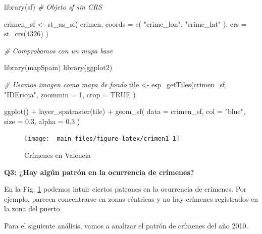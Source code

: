 \documentclass[
]{book}
\newenvironment{Shaded}{\begin{snugshade}}{\end{snugshade}}
\newcommand{\AttributeTok}[1]{\textcolor[rgb]{0.77,0.63,0.00}{#1}}
\newcommand{\CommentTok}[1]{\textcolor[rgb]{0.56,0.35,0.01}{\textit{#1}}}
\newcommand{\ConstantTok}[1]{\textcolor[rgb]{0.00,0.00,0.00}{#1}}
\newcommand{\DecValTok}[1]{\textcolor[rgb]{0.00,0.00,0.81}{#1}}
\newcommand{\FloatTok}[1]{\textcolor[rgb]{0.00,0.00,0.81}{#1}}
\newcommand{\FunctionTok}[1]{\textcolor[rgb]{0.00,0.00,0.00}{#1}}
\newcommand{\NormalTok}[1]{#1}
\newcommand{\OtherTok}[1]{\textcolor[rgb]{0.56,0.35,0.01}{#1}}
\newcommand{\SpecialCharTok}[1]{\textcolor[rgb]{0.00,0.00,0.00}{#1}}
\newcommand{\StringTok}[1]{\textcolor[rgb]{0.31,0.60,0.02}{#1}}
\begin{document}
\begin{Shaded}
\begin{Highlighting}[]

\FunctionTok{library}\NormalTok{(sf)}
\CommentTok{\# Objeto sf sin CRS}

\NormalTok{crimen\_sf }\OtherTok{\textless{}{-}} \FunctionTok{st\_as\_sf}\NormalTok{(}
\NormalTok{  crimen,}
  \AttributeTok{coords =} \FunctionTok{c}\NormalTok{(}
    \StringTok{"crime\_lon"}\NormalTok{,}
    \StringTok{"crime\_lat"}
\NormalTok{  ),}
  \AttributeTok{crs =} \FunctionTok{st\_crs}\NormalTok{(}\DecValTok{4326}\NormalTok{)}
\NormalTok{)}

\CommentTok{\# Comprobamos con un mapa base}

\FunctionTok{library}\NormalTok{(mapSpain)}
\FunctionTok{library}\NormalTok{(ggplot2)}

\CommentTok{\# Usamos imagen como mapa de fondo}
\NormalTok{tile }\OtherTok{\textless{}{-}} \FunctionTok{esp\_getTiles}\NormalTok{(crimen\_sf, }\StringTok{"IDErioja"}\NormalTok{,}
  \AttributeTok{zoommin =} \DecValTok{1}\NormalTok{,}
  \AttributeTok{crop =} \ConstantTok{TRUE}
\NormalTok{)}

\FunctionTok{ggplot}\NormalTok{() }\SpecialCharTok{+}
  \FunctionTok{layer\_spatraster}\NormalTok{(tile) }\SpecialCharTok{+}
  \FunctionTok{geom\_sf}\NormalTok{(}
    \AttributeTok{data =}\NormalTok{ crimen\_sf,}
    \AttributeTok{col =} \StringTok{"blue"}\NormalTok{,}
    \AttributeTok{size =} \FloatTok{0.3}\NormalTok{,}
    \AttributeTok{alpha =} \FloatTok{0.3}
\NormalTok{  )}
\end{Highlighting}
\end{Shaded}

\begin{figure}

{\centering \texttt{[image: \_main\_files/figure-latex/crimen1-1]} 

}

\caption{Crímenes en Valencia}\label{fig:crimen1}
\end{figure}

\textbf{Q3: ¿Hay algún patrón en la ocurrencia de crímenes?}

En la Fig. \ref{fig:crimen1} podemos intuir ciertos patrones en la ocurrencia
de crímenes. Por ejemplo, parecen concentrarse en zonas céntricas y no hay
crímenes registrados en la zona del puerto.

Para el siguiente análisis, vamos a analizar el patrón de crímenes del año 2010.
\end{document}
